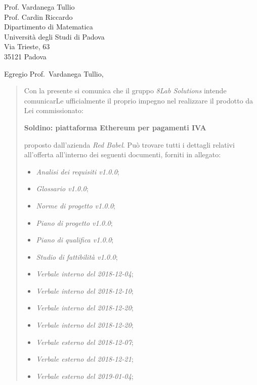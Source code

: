 \begin{letter}{
		Prof. Vardanega Tullio \\
		Prof. Cardin Riccardo \\
		Dipartimento di Matematica \\
		Università degli Studi di Padova \\
		Via Trieste, 63 \\
		35121 Padova}
		
\opening{Egregio Prof.~Vardanega Tullio,}

\begin{quotation}
Con la presente si comunica che il gruppo \textit{8Lab Solutions} intende 
comunicarLe ufficialmente il proprio impegno nel realizzare il prodotto da Lei 
commissionato:

\begin{center}
	\textbf{Soldino: piattaforma Ethereum per pagamenti IVA}
\end{center}

\noindent proposto dall'azienda \textit{Red Babel}.
Può trovare tutti i dettagli relativi all'offerta all'interno dei seguenti 
documenti, forniti in allegato:

\begin{itemize}
	\item \textit{Analisi dei requisiti v1.0.0};
	
	\item \textit{Glossario v1.0.0};
	
	\item \textit{Norme di progetto v1.0.0};

	\item \textit{Piano di progetto v1.0.0};

	\item \textit{Piano di qualifica v1.0.0};

	\item \textit{Studio di fattibilità v1.0.0};

	\item \textit{Verbale interno del 2018-12-04};
	\item \textit{Verbale interno del 2018-12-10};
	\item \textit{Verbale interno del 2018-12-20};
	\item \textit{Verbale interno del 2018-12-20};
	
	\item \textit{Verbale esterno del 2018-12-07};
	\item \textit{Verbale esterno del 2018-12-21};
	\item \textit{Verbale esterno del 2019-01-04};
\end{itemize}


\end{quotation}
\end{letter}
